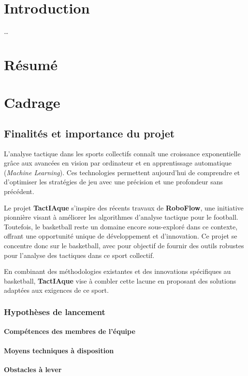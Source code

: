 \section*{Introduction}
\dots
\newpage
\section{Résumé}

\section{Cadrage}
\subsection{Finalités et importance du projet}
L’analyse tactique dans les sports collectifs connaît une croissance exponentielle grâce aux avancées en vision par ordinateur et en apprentissage automatique (\emph{Machine Learning}). Ces technologies permettent aujourd’hui de comprendre et d’optimiser les stratégies de jeu avec une précision et une profondeur sans précédent.

Le projet \textbf{TactIAque} s’inspire des récents travaux de \textbf{RoboFlow}, une initiative pionnière visant à améliorer les algorithmes d’analyse tactique pour le football. Toutefois, le basketball reste un domaine encore sous-exploré dans ce contexte, offrant une opportunité unique de développement et d’innovation. Ce projet se concentre donc sur le basketball, avec pour objectif de fournir des outils robustes pour l’analyse des tactiques dans ce sport collectif.

En combinant des méthodologies existantes et des innovations spécifiques au basketball, \textbf{TactIAque} vise à combler cette lacune en proposant des solutions adaptées aux exigences de ce sport.
\subsubsection{Hypothèses de lancement}
    \paragraph{Compétences des membres de l'équipe}
    \paragraph{Moyens techniques à disposition}
    \paragraph{Obstacles à lever}

